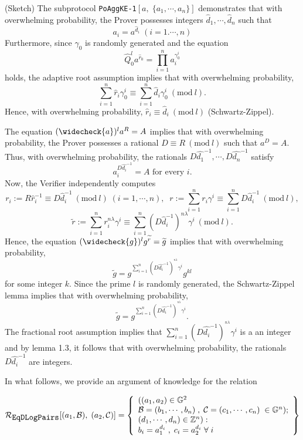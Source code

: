\documentclass[11pt, lettersize, notitlepage, leqno, footskip=0.6cm]{article}
\newcommand{\pl}{\prod\limits}
\newcommand{\slim}{\sum\limits}
\newcommand{\wti}{\widetilde}
\newcommand{\mc}{\mathcal}
\newcommand{\mb}{\mathbb}
\newcommand{\lam}{\lambda}
\newcommand{\what}{\widehat}
\newcommand{\weck}{\widecheck}
\newcommand{\vs}{\vspace{-0.15cm}}
\newcommand{\op}{overwhelming probability}
\newcommand{\Mod}[1]{\ (\mathrm{mod}\ #1)}
\numberwithin{equation}{section}
\begin{document}
\begin{prf} (Sketch) The subprotocol \verb|PoAggKE-1|$[a,\;\{a_1,\cdots,a_n\}]$ demonstrates that with \op, the Prover possesses integers $\what{d}_1,\cdots,\what{d}_n$ such that \vs $$a_i = a^{\what{d}_i}\; (i=1.\cdots,n)$$ Furthermore, since $\gamma_0$ is randomly generated and the equation \vs $$\what{Q}_0^la^{\what{r}_0} = \pl_{i=1}^{n} a_i^{\gamma_0^i} $$ holds, the adaptive root assumption implies that with \op, \vs $$\slim_{i=1}^n\what{r}_i\gamma_0^i\equiv \slim_{i=1}^n \what{d}_i\gamma_0^i\Mod{l}.$$ Hence, with \op, $\what{r}_i\equiv \what{d}_i\Mod{l}$ (Schwartz-Zippel).

The equation $(\weck{a})^la^R= A $ implies that with \op, the Prover possesses a rational $D\equiv R\Mod{l}$ such that $a^D = A$. Thus, with \op, the rationals $D\what{d_1}^{-1},\cdots,D\what{d_n}^{-1}$ satisfy \vs $$a_i^{D\what{d_i}^{-1}} = A \text{ for every }i.$$ Now, the Verifier independently computes \vs $$r_i:= R\what{r}_{i}^{-1}\equiv D\what{d}_i^{-1}\Mod{l}\;(i=1,\cdots,n),\;\;r:= \slim_{i=1}^n r_i\gamma^i\equiv \slim_{i=1}^n D\what{d}_i^{-1}\Mod{l},$$\vspace{-0.3cm} $$\wti{r}:= {\slim_{i=1}^n r_i^{n\lam}\gamma^i}\equiv {\slim_{i=1}^n (D\what{d}_i^{-1})^{n\lam}\gamma^i}\Mod{l}.$$ Hence, the equation $(\weck{g})^lg^{\wti{r}} = \wti{g}$ implies that with \op, \vs $$\wti{g} = g^{\slim_{i=1}^n (D\what{d_i}^{-1})^{^{n\lam}}\gamma^i}g^{kl} $$ for some integer $k$. Since the prime $l$ is randomly generated, the Schwartz-Zippel lemma implies that with \op, \vs $$\wti{g} = g^{\slim_{i=1}^n (D\what{d_i}^{-1})^{^{n\lam}}\gamma^i}. $$ The fractional root assumption implies that $\slim_{i=1}^n (D\what{d_i}^{-1})^{^{n\lam}}\gamma^i$ is a an integer and by lemma 1.3, it follows that with \op, the rationals $D\what{d_i}^{-1}$ are integers.\end{prf}

In what follows, we provide an argument of knowledge for the relation 

\[
  \mc{R}_{{\protect\verb|EqDLogPairs|}}[(a_1, \mc{B}),\; (a_2, \mc{C})] = \left\{\begin{array}{l}
  	((a_1, a_2)\in\mb{G}^2\\
    \mc{B} = (b_1,\cdots, b_n)\;,\;\mc{C} = (c_1,\cdots, c_n)\;\in\mb{G}^n);\\
    (d_1,\cdots,d_n)\in\mb{Z}^n): \\
    b_i = a_1^{d_i}\;,\;c_i = a_2^{d_i} \;\forall\;i
  \end{array}\right\}
\]
\end{document}
